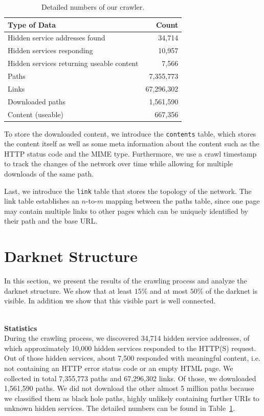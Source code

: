\documentclass[USenglish,oneside,twocolumn]{article}
\newcommand{\sh}[1]{\noindent\vspace{0.5\baselineskip}\\ \textbf{#1}\\}
\begin{document}
\begin{table}[b]
    \caption{Detailed numbers of our crawler.}
    \label{table:scrapMetrics}
    \begin{tabular}[l]{p{5.5cm} | r{2.25cm}}
    \textbf{Type of Data}           & \textbf{Count} \\
    \hline
    \hline
    Hidden service addresses found      & 34,714                                    \\
    \hline
    Hidden services responding                & 10,957                      \\
    \hline
    Hidden services returning useable content & 7,566                      \\
    \hline
    Paths                           & 7,355,773                   \\
    \hline
    Links                           & 67,296,302                \\
    \hline
    Downloaded paths                & 1,561,590                 \\
    \hline
    Content (useable)               & 667,356         \\
    \end{tabular}
\end{table}

To store the downloaded content, we introduce the \texttt{contents} table, which stores the content itself as well as some meta information about the content such as the HTTP status code and the MIME type. Furthermore, we use a crawl timestamp to track the changes of the network over time while allowing for multiple downloads of the same path.

Last, we introduce the \texttt{link} table that stores the topology of the network. The link table establishes an $n$-to-$m$ mapping between the paths table, since one page may contain multiple links to other pages which can be uniquely identified by their path and the base URL.
%
%
\section{Darknet Structure}
\label{sec:data}
In this section, we present the results of the crawling process and analyze the darknet structure. We show that at least $15\%$ and at most $50\%$ of the darknet is visible. In addition we show that this visible part is well connected. 

\sh{Statistics}
During the crawling process, we discovered 34,714 hidden service addresses, of which approximately 10,000 hidden services responded to the HTTP(S) request. Out of those hidden services, about 7,500 responded with meaningful content, i.e. not containing an HTTP error status code or an empty HTML page.
We collected in total 7,355,773 paths and 67,296,302 links. Of those, we downloaded 1,561,590 paths. We did not download the other almost 5 million paths because we classified them as black hole paths, highly unlikely containing further URIs to unknown hidden services. The detailed numbers can be found in Table~\ref{table:scrapMetrics}.
\end{document}
